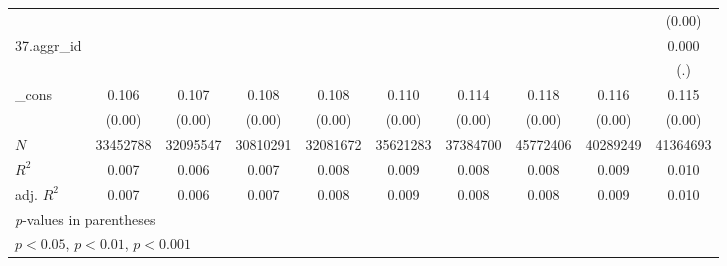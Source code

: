 {\begin{tabular}{l*{9}{c}}
          &                  &                  &                  &                  &                  &                  &                  &                  &   (0.00)         \\
[1em]
37.aggr\_id&                  &                  &                  &                  &                  &                  &                  &                  &    0.000         \\
          &                  &                  &                  &                  &                  &                  &                  &                  &      (.)         \\
[1em]
\_cons    &    0.106\sym{***}&    0.107\sym{***}&    0.108\sym{***}&    0.108\sym{***}&    0.110\sym{***}&    0.114\sym{***}&    0.118\sym{***}&    0.116\sym{***}&    0.115\sym{***}\\
          &   (0.00)         &   (0.00)         &   (0.00)         &   (0.00)         &   (0.00)         &   (0.00)         &   (0.00)         &   (0.00)         &   (0.00)         \\
\hline
\(N\)     & 33452788         & 32095547         & 30810291         & 32081672         & 35621283         & 37384700         & 45772406         & 40289249         & 41364693         \\
\(R^{2}\) &    0.007         &    0.006         &    0.007         &    0.008         &    0.009         &    0.008         &    0.008         &    0.009         &    0.010         \\
adj. \(R^{2}\)&    0.007         &    0.006         &    0.007         &    0.008         &    0.009         &    0.008         &    0.008         &    0.009         &    0.010         \\
\hline\hline
\multicolumn{10}{l}{\footnotesize \textit{p}-values in parentheses}\\
\multicolumn{10}{l}{\footnotesize \sym{*} \(p<0.05\), \sym{**} \(p<0.01\), \sym{***} \(p<0.001\)}\\
\end{tabular}
}

